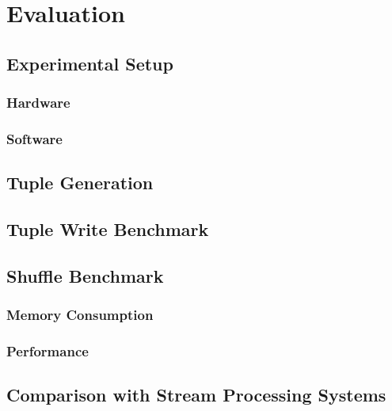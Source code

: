 
\chapter{Evaluation}\label{chapter:evaluation}

\section{Experimental Setup}

\subsection{Hardware}
\subsection{Software}

\section{Tuple Generation}

\section{Tuple Write Benchmark}

\section{Shuffle Benchmark}

\subsection{Memory Consumption}
\subsection{Performance}

\section{Comparison with Stream Processing Systems}
